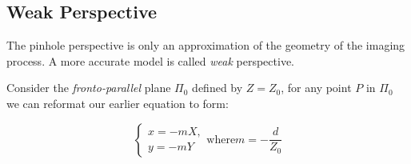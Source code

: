 \documentclass{article}
\begin{document}
\subsection{Weak Perspective}

The pinhole perspective is only an approximation of the geometry of the imaging process. A more accurate model is called \textit{weak} perspective.

Consider the \textit{fronto-parallel} plane $\Pi_{0}$ defined by $Z = Z_{0}$, for any point $P$ in $\Pi_{0}$ we can reformat our earlier equation to form:

\[
  \begin{cases}
    x = -mX, \\
    y = -mY
  \end{cases}

  \text{where} m = - \frac{d}{Z_{0}}
\]
\end{document}
